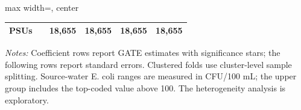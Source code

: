 \begin{landscape}
\begin{table}[p]
\begin{adjustbox}{max width=\linewidth, center}
\begin{tabular}{llcccc}
\quad PSUs &  & 18,655 & 18,655 & 18,655 & 18,655 \\
\bottomrule
\end{tabular}
\end{adjustbox}
\par\vspace{3pt}
\begin{minipage}{\linewidth}\footnotesize \textit{Notes:} Coefficient rows report GATE estimates with significance stars; the following rows report standard errors. Clustered folds use cluster-level sample splitting. Source-water E. coli ranges are measured in CFU/100 mL; the upper group includes the top-coded value above 100. The heterogeneity analysis is exploratory.\end{minipage}
\end{table}
\end{landscape}